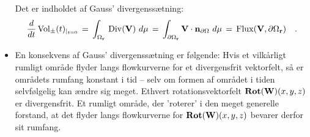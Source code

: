 \begin{summary}
\begin{itemize}
     Det er indholdet af Gauss' divergenssætning:
\begin{equation}
\frac{d}{dt}\operatorname{Vol}_{\pm}(t)_{|_{t=0}}\, = \,
\int_{\Omega_{\bf{r}}} \, \operatorname{Div}({\bf{V}}) \,\,
d\mu \, = \, \int_{\partial \Omega_{\bf{r}}}{\bf
V}\cdot {\bf{n}}_{\partial \Omega}\,\,d\mu \, =
\, \operatorname{Flux}({\bf{V}},
\partial \Omega_{\bf{r}}) \quad .
\end{equation}
\item En konsekvens af Gauss' divergenssætning er følgende: Hvis et vilkårligt rumligt område flyder langs flowkurverne for et divergensfrit vektorfelt, så er områdets rumfang konstant i tid -- selv om formen af området i tiden selvfølgelig kan ændre sig meget. Ethvert rotationsvektorfelt $\operatorname{\mathbf{Rot}}(\mathbf{W})(x,y,z)$  er divergensfrit. Et rumligt område, der 'roterer' i den meget generelle forstand, at det flyder langs flowkurverne for  $\operatorname{\mathbf{Rot}}(\mathbf{W})(x,y,z)$ bevarer derfor sit rumfang.
\end{itemize}
\end{summary}






